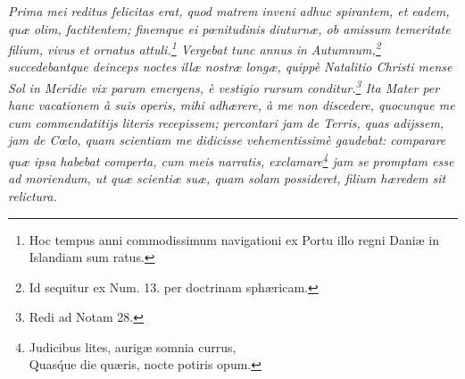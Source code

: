 \documentclass[a4paper, 11pt, oneside, polutonikogreek, german]{article}
\begin{document}
\emph{Prima mei reditus felicitas erat, quod matrem inveni adhuc spirantem, et eadem, quæ olim, factitentem; finemque ei pœnitudinis diuturnæ, ob amissum temeritate filium, vivus et ornatus attuli.\footnote{Hoc tempus anni commodissimum navigationi ex Portu illo regni Daniæ in Islandiam sum ratus.} Vergebat tunc annus in Autumnum,\footnote{Id sequitur ex Num. 13. per doctrinam sphæricam.} succedebantque deinceps noctes illæ nostræ longæ, quippè Natalitio Christi mense Sol in Meridie vix parum emergens, è vestigio rursum conditur.\footnote{Redi ad Notam 28.} Ita Mater per hanc vacationem à suis operis, mihi adhærere, à me non discedere, quocunque me cum commendatitijs literis recepissem; percontari jam de Terris, quas adijssem, jam de Cœlo, quam scientiam me didicisse vehementissimè gaudebat: comparare quæ ipsa habebat comperta, cum meis narratis, exclamare\footnote{Judicibus lites, aurigæ somnia currus,\\\hspace*{5mm}Quas\'que die quæris, nocte potiris opum.} jam se promptam esse ad moriendum, ut quæ scientiæ suæ, quam solam possideret, filium hæredem sit relictura.}
\end{document}
